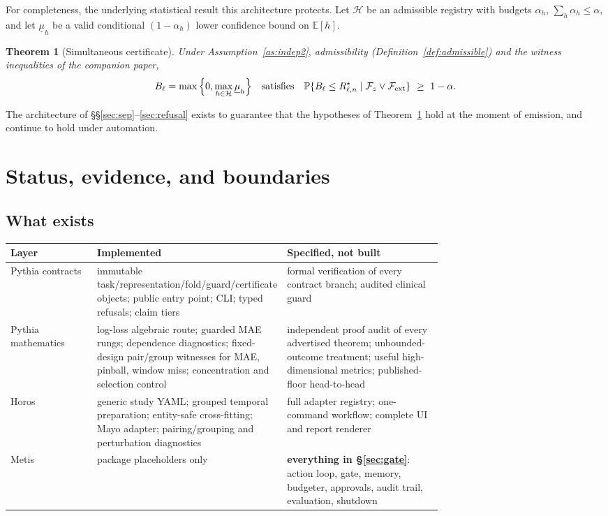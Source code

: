 \documentclass[11pt,a4paper]{article}
\newtheorem{theorem}{Theorem}[section]
\theoremstyle{definition}
\theoremstyle{remark}
\newcommand{\risk}{R^{\star}}
\newcommand{\E}{\mathbb{E}}
\newcommand{\Prob}{\mathbb{P}}
\newcommand{\Fcal}{\mathcal{F}}
\newcommand{\Hcal}{\mathcal{H}}
\begin{document}
For completeness, the underlying statistical result this architecture protects. Let $\Hcal$ be an admissible registry with budgets $\alpha_h$, $\sum_h\alpha_h\le\alpha$, and let $\underline\mu_h$ be a valid conditional $(1-\alpha_h)$ lower confidence bound on $\E[h]$.

\begin{theorem}[Simultaneous certificate]\label{thm:certrestate}
Under Assumption~\ref{as:indep2}, admissibility (Definition~\ref{def:admissible}) and the witness inequalities of the companion paper,
\[
B_\ell=\max\Big\{0,\max_{h\in\Hcal}\underline\mu_h\Big\}
\quad\text{satisfies}\quad
\Prob\{B_\ell\le\risk_{\ell,n}\mid \Fcal_z\vee\Fcal_{\rm ext}\}\ \ge\ 1-\alpha .
\]
\end{theorem}

The architecture of \S\S\ref{sec:sep}--\ref{sec:refusal} exists to guarantee that the hypotheses of Theorem~\ref{thm:certrestate} hold at the moment of emission, and continue to hold under automation.

\section{Status, evidence, and boundaries}\label{sec:status}

\subsection{What exists}

\begin{center}
\small
\begin{tabular}{@{}lp{0.36\linewidth}p{0.36\linewidth}@{}}
\toprule
Layer & Implemented & Specified, not built \\
\midrule
Pythia contracts & immutable task/representation/fold/guard/certificate objects; public entry point; CLI; typed refusals; claim tiers & formal verification of every contract branch; audited clinical guard \\
Pythia mathematics & log-loss algebraic route; guarded MAE rungs; dependence diagnostics; fixed-design pair/group witnesses for MAE, pinball, window miss; concentration and selection control & independent proof audit of every advertised theorem; unbounded-outcome treatment; useful high-dimensional metrics; published-floor head-to-head \\
Horos & generic study YAML; grouped temporal preparation; entity-safe cross-fitting; Mayo adapter; pairing/grouping and perturbation diagnostics & full adapter registry; one-command workflow; complete UI and report renderer \\
Metis & package placeholders only & \textbf{everything in \S\ref{sec:gate}}: action loop, gate, memory, budgeter, approvals, audit trail, evaluation, shutdown \\
\bottomrule
\end{tabular}
\end{center}
\end{document}
